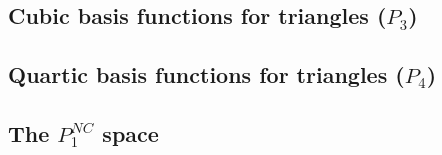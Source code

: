 \subsection{Cubic basis functions for triangles ($P_3$) \label{basis:p3}}


\subsection{Quartic basis functions for triangles ($P_4$) \label{basis:p4}}







\subsection{The $P_1^{NC}$ space} \label{ss:p1nc}




